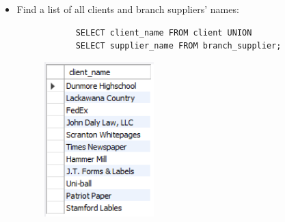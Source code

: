\begin{itemize}
    \item Find a list of all clients and branch suppliers' names:
        \begin{verbatim}
            SELECT client_name FROM client UNION 
            SELECT supplier_name FROM branch_supplier;
        \end{verbatim}
        \begin{figure}[H]
            \centering
            \includegraphics[width=0.4\textwidth]{./Figs/2020-12-24-21-04-04.png}
        \end{figure}


\end{itemize}
